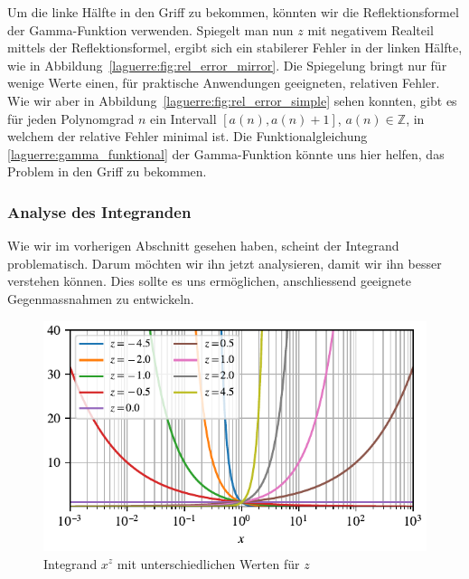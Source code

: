 Um die linke Hälfte in den Griff zu bekommen,
könnten wir die Reflektionsformel der Gamma-Funktion verwenden.
Spiegelt man nun $z$ mit negativem Realteil mittels der Reflektionsformel,
ergibt sich ein stabilerer Fehler in der linken Hälfte,
wie in Abbildung~\ref{laguerre:fig:rel_error_mirror}.
Die Spiegelung bringt nur für wenige Werte einen,
für praktische Anwendungen geeigneten,
relativen Fehler.
Wie wir aber in Abbildung~\ref{laguerre:fig:rel_error_simple} sehen konnten,
gibt es für jeden Polynomgrad $n$ ein Intervall $[a(n), a(n) + 1]$,
$a(n) \in \mathbb{Z}$,
in welchem der relative Fehler minimal ist.
Die Funktionalgleichung
\eqref{laguerre:gamma_funktional}
der Gamma-Funktion
könnte uns hier helfen,
das Problem in den Griff zu bekommen.

\subsubsection{Analyse des Integranden}
Wie wir im vorherigen Abschnitt gesehen haben,
scheint der Integrand problematisch.
Darum möchten wir ihn jetzt analysieren,
damit wir ihn besser verstehen können.
Dies sollte es uns ermöglichen,
anschliessend geeignete Gegenmassnahmen zu entwickeln.

\begin{figure}
\centering
% 
\includegraphics{papers/laguerre/images/integrand.pdf}
\caption{Integrand $x^z$ mit unterschiedlichen Werten für $z$}
\label{laguerre:fig:integrand}
\end{figure}

